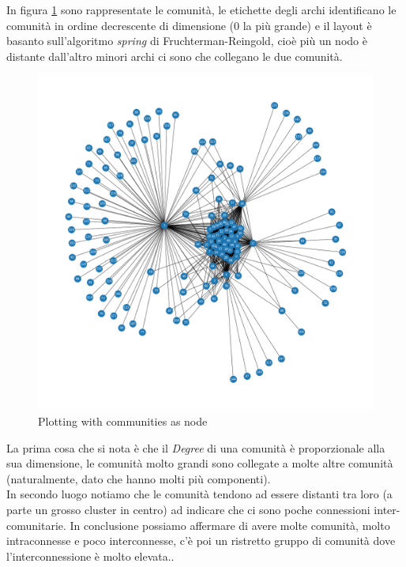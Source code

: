 \documentclass[a4paper]{article}
\begin{document}
In figura \ref{FIG:communities_plot} sono rappresentate le comunità, le etichette degli archi identificano le comunità in ordine decrescente di dimensione (0 la più grande) e il layout è basanto sull'algoritmo \textit{spring} di Fruchterman-Reingold, cioè più un nodo è distante dall'altro minori archi ci sono che collegano le due comunità.\\
\begin{figure}[!ht]
\centering
\includegraphics[width=1\textwidth]{cummunity_plot.png}
\caption{Plotting with communities as node} \label{FIG:communities_plot}
\end{figure}
La prima cosa che si nota è che il \textit{Degree} di una comunità è proporzionale alla sua dimensione, le comunità molto grandi sono collegate a molte altre comunità (naturalmente, dato che hanno molti più componenti).\\
In secondo luogo notiamo che le comunità tendono ad essere distanti tra loro (a parte un grosso cluster in centro) ad indicare che ci sono poche connessioni inter-comunitarie.
In conclusione possiamo affermare di avere molte comunità, molto intraconnesse e poco interconnesse, c'è poi un ristretto gruppo di comunità dove l'interconnessione è molto elevata..
\end{document}
